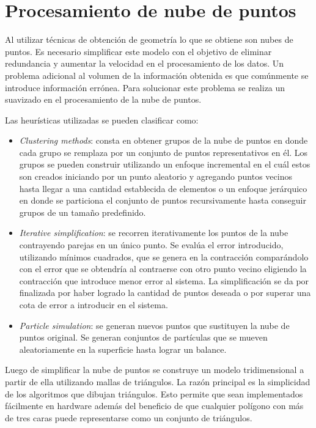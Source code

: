 \section{Procesamiento de nube de puntos}

Al utilizar técnicas de obtención de geometría lo que se obtiene son nubes de puntos. Es necesario simplificar este modelo con el objetivo de eliminar redundancia y aumentar la velocidad en el procesamiento de los datos. Un problema adicional al volumen de la información obtenida es que comúnmente se introduce información errónea. Para solucionar este problema se realiza un suavizado en el procesamiento de la nube de puntos\cite{PCloudSimplify}.

Las heurísticas utilizadas se pueden clasificar como\cite{PntCloud}:
\begin{itemize}
   \item \emph{Clustering methods}: consta en obtener grupos de la nube de puntos en donde cada grupo se remplaza por un conjunto de puntos representativos en él. Los grupos se pueden construir utilizando un enfoque incremental en el cuál estos son creados iniciando por un punto aleatorio y agregando puntos vecinos hasta llegar a una cantidad establecida de elementos o un enfoque jerárquico en donde se particiona el conjunto de puntos recursivamente hasta conseguir grupos de un tamaño predefinido.
   \item \emph{Iterative simplification}: se recorren iterativamente los puntos de la nube contrayendo parejas en un único punto. Se evalúa el error introducido, utilizando mínimos cuadrados, que se genera en la contracción comparándolo con el error que se obtendría al contraerse con otro punto vecino eligiendo la contracción que introduce menor error al sistema. La simplificación se da por finalizada por haber logrado la cantidad de puntos deseada o por superar una cota de error a introducir en el sistema.
   \item \emph{Particle simulation}: se generan nuevos puntos que sustituyen la nube de puntos original. Se generan conjuntos de partículas que se mueven aleatoriamente en la superficie hasta lograr un balance. %
\end{itemize}

Luego de simplificar la nube de puntos se construye un modelo tridimensional a partir de ella utilizando mallas de triángulos. La razón principal es la simplicidad de los algoritmos que dibujan triángulos. Esto permite que sean implementados fácilmente en hardware además del beneficio de que cualquier polígono con más de tres caras puede representarse como un conjunto de triángulos\cite{PCloudTriangle}.

